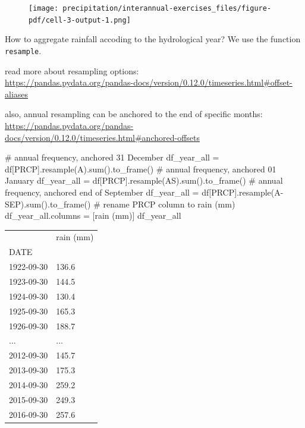 \documentclass[
  letterpaper,
  DIV=11,
  numbers=noendperiod]{scrreprt}
\newenvironment{Shaded}{\begin{snugshade}}{\end{snugshade}}
\newcommand{\BuiltInTok}[1]{\textcolor[rgb]{0.00,0.23,0.31}{#1}}
\newcommand{\CommentTok}[1]{\textcolor[rgb]{0.37,0.37,0.37}{#1}}
\newcommand{\NormalTok}[1]{\textcolor[rgb]{0.00,0.23,0.31}{#1}}
\newcommand{\OperatorTok}[1]{\textcolor[rgb]{0.37,0.37,0.37}{#1}}
\newcommand{\StringTok}[1]{\textcolor[rgb]{0.13,0.47,0.30}{#1}}
\begin{document}
\begin{figure}[H]

{\centering \texttt{[image: precipitation/interannual-exercises\_files/figure-pdf/cell-3-output-1.png]}

}

\end{figure}

How to aggregate rainfall accoding to the hydrological year? We use the
function \texttt{resample}.

read more about resampling options:\\
\url{https://pandas.pydata.org/pandas-docs/version/0.12.0/timeseries.html\#offset-aliases}

also, annual resampling can be anchored to the end of specific months:
\url{https://pandas.pydata.org/pandas-docs/version/0.12.0/timeseries.html\#anchored-offsets}

\begin{Shaded}
\begin{Highlighting}[]
\CommentTok{\# annual frequency, anchored 31 December}
\NormalTok{df\_year\_all }\OperatorTok{=}\NormalTok{ df[}\StringTok{\textquotesingle{}PRCP\textquotesingle{}}\NormalTok{].resample(}\StringTok{\textquotesingle{}A\textquotesingle{}}\NormalTok{).}\BuiltInTok{sum}\NormalTok{().to\_frame()}
\CommentTok{\# annual frequency, anchored 01 January}
\NormalTok{df\_year\_all }\OperatorTok{=}\NormalTok{ df[}\StringTok{\textquotesingle{}PRCP\textquotesingle{}}\NormalTok{].resample(}\StringTok{\textquotesingle{}AS\textquotesingle{}}\NormalTok{).}\BuiltInTok{sum}\NormalTok{().to\_frame()}
\CommentTok{\# annual frequency, anchored end of September}
\NormalTok{df\_year\_all }\OperatorTok{=}\NormalTok{ df[}\StringTok{\textquotesingle{}PRCP\textquotesingle{}}\NormalTok{].resample(}\StringTok{\textquotesingle{}A{-}SEP\textquotesingle{}}\NormalTok{).}\BuiltInTok{sum}\NormalTok{().to\_frame()}
\CommentTok{\# rename \textquotesingle{}PRCP\textquotesingle{} column to \textquotesingle{}rain (mm)\textquotesingle{}}
\NormalTok{df\_year\_all.columns }\OperatorTok{=}\NormalTok{ [}\StringTok{\textquotesingle{}rain (mm)\textquotesingle{}}\NormalTok{]}
\NormalTok{df\_year\_all}
\end{Highlighting}
\end{Shaded}

\begin{longtable}[]{@{}ll@{}}
\toprule()
& rain (mm) \\
DATE & \\
\midrule()
\endhead
1922-09-30 & 136.6 \\
1923-09-30 & 144.5 \\
1924-09-30 & 130.4 \\
1925-09-30 & 165.3 \\
1926-09-30 & 188.7 \\
... & ... \\
2012-09-30 & 145.7 \\
2013-09-30 & 175.3 \\
2014-09-30 & 259.2 \\
2015-09-30 & 249.3 \\
2016-09-30 & 257.6 \\
\bottomrule()
\end{longtable}
\end{document}
